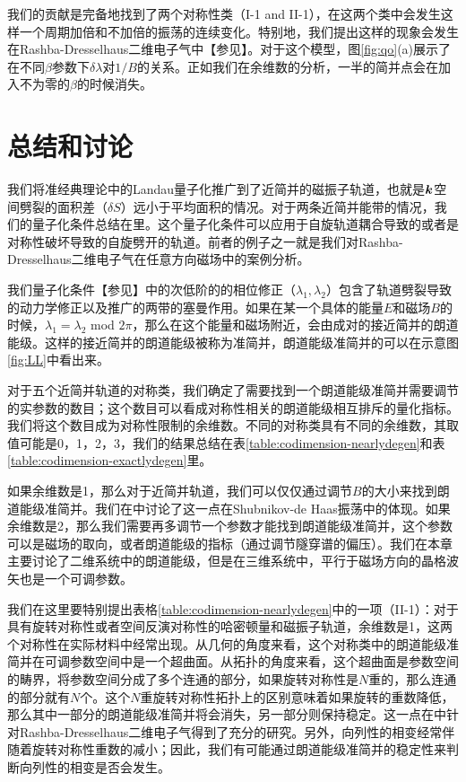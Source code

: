 我们的贡献是完备地找到了两个对称性类（I-1 and II-1），在这两个类中会发生这样一个周期加倍和不加倍的振荡的连续变化。特别地，我们提出这样的现象会发生在Rashba-Dresselhaus二维电子气中【参见】。对于这个模型，图\ref{fig:qo}(a)展示了在不同$\beta$参数下$\delta \lambda$对$1/B$的关系。正如我们在余维数的分析，一半的简并点会在加入不为零的$\beta$的时候消失。

\section{总结和讨论}\label{sec:discussion}

我们将准经典理论中的Landau量子化推广到了近简并的磁振子轨道，也就是$\boldsymbol{k}$空间劈裂的面积差（$\delta S$）远小于平均面积的情况。对于两条近简并能带的情况，我们的量子化条件总结在里。这个量子化条件可以应用于自旋轨道耦合导致的或者是对称性破坏导致的自旋劈开的轨道。前者的例子之一就是我们对Rashba-Dresselhaus二维电子气在任意方向磁场中的案例分析。

我们量子化条件【参见】中的次低阶的的相位修正（$\lambda_1,\lambda_2$）包含了轨道劈裂导致的动力学修正以及推广的两带的塞曼作用。如果在某一个具体的能量$E$和磁场$B$的时候，$\lambda_1{=}\lambda_2$ mod $2\pi$，那么在这个能量和磁场附近，会由成对的接近简并的朗道能级。这样的接近简并的朗道能级被称为准简并，朗道能级准简并的可以在示意图\ref{fig:LL}中看出来。


对于五个近简并轨道的对称类，我们确定了需要找到一个朗道能级准简并需要调节的实参数的数目；这个数目可以看成对称性相关的朗道能级相互排斥的量化指标。我们将这个数目成为对称性限制的余维数。不同的对称类具有不同的余维数，其取值可能是0，1，2，3，我们的结果总结在表\ref{table:codimension-nearlydegen}和表\ref{table:codimension-exactlydegen}里。

如果余维数是1，那么对于近简并轨道，我们可以仅仅通过调节$B$的大小来找到朗道能级准简并。我们在中讨论了这一点在Shubnikov-de Haas振荡中的体现。如果余维数是2，那么我们需要再多调节一个参数才能找到朗道能级准简并，这个参数可以是磁场的取向\cite{yakovenko_angular_2006}，或者朗道能级的指标（通过调节隧穿谱的偏压）\cite{Sangjun_Cd3As2,Ilija_SnTe,kushwaha_Dirac}。我们在本章主要讨论了二维系统中的朗道能级，但是在三维系统中，平行于磁场方向的晶格波矢也是一个可调参数。


我们在这里要特别提出表格\ref{table:codimension-nearlydegen}中的一项（II-1）：对于具有旋转对称性或者空间反演对称性的哈密顿量和磁振子轨道，余维数是1，这两个对称性在实际材料中经常出现。从几何的角度来看，这个对称类中的朗道能级准简并在可调参数空间中是一个超曲面。从拓扑的角度来看，这个超曲面是参数空间的畴界，将参数空间分成了多个连通的部分，如果旋转对称性是$N$重的，那么连通的部分就有$N$个。这个$N$重旋转对称性拓扑上的区别意味着如果旋转的重数降低，那么其中一部分的朗道能级准简并将会消失，另一部分则保持稳定。这一点在中针对Rashba-Dresselhaus二维电子气得到了充分的研究。另外，向列性的相变经常伴随着旋转对称性重数的减小\cite{fradkin_nematic_2010}；因此，我们有可能通过朗道能级准简并的稳定性来判断向列性的相变是否会发生。

